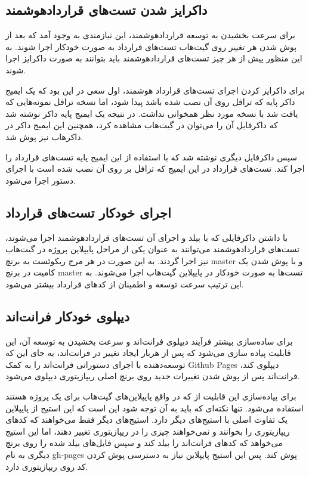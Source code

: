\subsection{داکرایز شدن تست‌های قراردادهوشمند}
برای سرعت بخشیدن به توسعه قراردادهوشمند، این نیازمندی به وجود آمد که بعد از پوش شدن هر تغییر روی گیت‌هاب تست‌های قرارداد به صورت خودکار اجرا شوند. به این منظور پیش از هر چیز تست‌های قراردادهوشمند باید بتوانند به صورت داکرایز اجرا شوند.

برای داکرایز کردن اجرای تست‌های قرارداد هوشمند، اول سعی در این بود که یک ایمیج داکر پایه که ترافل روی آن نصب شده باشد پیدا شود، اما نسخه ترافل نمونه‌هایی که یافت شد با نسخه مورد نظر همخوانی نداشت. در نتیجه یک ایمیج پایه داکر نوشته شد که داکرفایل آن را می‌توان در گیت‌هاب
مشاهده کرد، همچنین این ایمیج داکر در داکرهاب
نیز پوش شد.

سپس داکرفایل دیگری نوشته شد که با استفاده از این ایمیج پایه تست‌های قرارداد را اجرا کند. تست‌های قرارداد در این ایمیج که ترافل بر روی آن نصب شده است با اجرای دستور
اجرا می‌شود.


\subsection{اجرای خودکار تست‌های قرارداد}
با داشتن داکرفایلی که با بیلد و اجرای آن تست‌های قراردادهوشمند اجرا می‌شوند، تست‌های قراردادهوشمند می‌توانند به عنوان یکی از مراحل پایپلاین پروژه در گیت‌هاب نیز اجرا گردند. به این صورت در هر مرج ریکوئست به برنچ master و با پوش شدن یک کامیت در برنچ master تست‌ها به صورت خودکار در پایپلاین گیت‌هاب اجرا می‌شوند. به این ترتیب سرعت توسعه و اطمینان از کدهای قرارداد بیشتر می‌شود.


\subsection{دیپلوی خودکار فرانت‌اند}
برای ساده‌سازی بیشتر فرآیند دیپلوی فرانت‌اند و سرعت بخشیدن به توسعه آن، این قابلیت پیاده سازی می‌شود که پس از هربار ایجاد تغییر در فرانت‌اند، به جای این که توسعه‌دهنده با اجرای دستوراتی فرانت‌اند را به کمک
\gls{Github Pages}
دیپلوی کند، فرانت‌اند پس از پوش شدن تغییرات جدید روی برنچ اصلی ریپازیتوری دیپلوی می‌شود.

برای پیاده‌سازی این قابلیت از
که در واقع پایپلاین‌های گیت‌هاب برای یک پروژه هستند استفاده می‌شود. تنها نکته‌ای که باید به آن توجه شود این است که این استیج از پایپلاین یک تفاوت اصلی با استیج‌های دیگر دارد. استیج‌های دیگر فقط می‌خواهند که کدهای ریپازیتوری را بخوانند و نمی‌خواهند چیزی را در ریپازیتوری تغییر دهند، اما این استیج می‌خواهد که کد‌های فرانت‌اند را بیلد کند و سپس فایل‌های بیلد شده را روی برنچ دیگری به نام gh-pages پوش کند. پس این استیج پایپلاین نیاز به دسترسی پوش کردن کد روی ریپازیتوری دارد.

